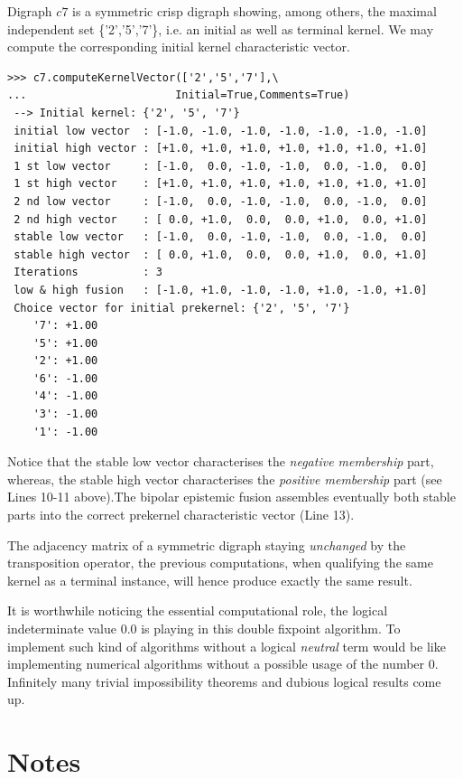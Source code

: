 Digraph $c7$ is a symmetric crisp digraph showing, among others, the maximal independent set \{'2','5','7'\}, i.e. an initial as well as terminal kernel. We may compute the corresponding initial kernel characteristic vector.
\begin{lstlisting}
>>> c7.computeKernelVector(['2','5','7'],\
...                       Initial=True,Comments=True)
 --> Initial kernel: {'2', '5', '7'}
 initial low vector  : [-1.0, -1.0, -1.0, -1.0, -1.0, -1.0, -1.0]
 initial high vector : [+1.0, +1.0, +1.0, +1.0, +1.0, +1.0, +1.0]
 1 st low vector     : [-1.0,  0.0, -1.0, -1.0,  0.0, -1.0,  0.0]
 1 st high vector    : [+1.0, +1.0, +1.0, +1.0, +1.0, +1.0, +1.0]
 2 nd low vector     : [-1.0,  0.0, -1.0, -1.0,  0.0, -1.0,  0.0]
 2 nd high vector    : [ 0.0, +1.0,  0.0,  0.0, +1.0,  0.0, +1.0]
 stable low vector   : [-1.0,  0.0, -1.0, -1.0,  0.0, -1.0,  0.0]
 stable high vector  : [ 0.0, +1.0,  0.0,  0.0, +1.0,  0.0, +1.0]
 Iterations          : 3
 low & high fusion   : [-1.0, +1.0, -1.0, -1.0, +1.0, -1.0, +1.0]
 Choice vector for initial prekernel: {'2', '5', '7'}
    '7': +1.00
    '5': +1.00
    '2': +1.00
    '6': -1.00
    '4': -1.00
    '3': -1.00
    '1': -1.00
\end{lstlisting}
Notice that the stable low vector characterises the \emph{negative membership} part, whereas, the stable high vector characterises the \emph{positive membership} part (see Lines 10-11 above).The bipolar epistemic fusion assembles eventually both stable parts into the correct prekernel characteristic vector (Line 13). 

The adjacency matrix of a symmetric digraph staying \emph{unchanged} by the transposition operator, the previous computations, when qualifying the same kernel as a terminal instance, will hence produce exactly the same result.

It is worthwhile noticing the essential computational role, the logical indeterminate value $0.0$ is playing in this double fixpoint algorithm. To implement such kind of algorithms without a logical \emph{neutral} term would be like implementing numerical algorithms without a possible usage of the number $0$. Infinitely many trivial impossibility theorems and dubious logical results come up. 

{}
\section*{Notes}

